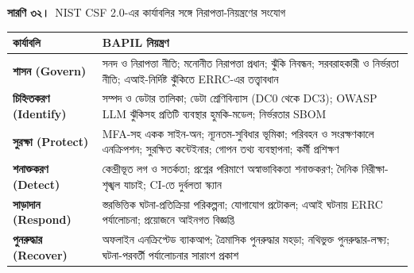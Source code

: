 \documentclass[border=10pt]{standalone}
\begin{document}
\begin{minipage}{17cm}
{\large\bfseries সারণি ৩২।}\ {\large NIST CSF 2.0-এর কার্যাবলির সঙ্গে নিরাপত্তা-নিয়ন্ত্রণের সংযোগ}\par\vspace{7pt}
\small
{}
\begin{tabularx}{\linewidth}{@{}>{\hsize=0.377\hsize\raggedright\arraybackslash}X>{\hsize=1.623\hsize\raggedright\arraybackslash}X@{}}
\arrayrulecolor{bapilrule}\toprule
\rowcolor{white}\textbf{কার্যাবলি} & \textbf{BAPIL নিয়ন্ত্রণ} \\
\midrule
\textbf{শাসন (Govern)} & সনদ ও নিরাপত্তা নীতি; মনোনীত নিরাপত্তা প্রধান; ঝুঁকি নিবন্ধন; সরবরাহকারী ও নির্ভরতা নীতি; এআই-নির্দিষ্ট ঝুঁকিতে ERRC-এর তত্ত্বাবধান \\
\textbf{চিহ্নিতকরণ (Identify)} & সম্পদ ও ডেটার তালিকা; ডেটা শ্রেণিবিন্যাস (DC0 থেকে DC3); OWASP LLM ঝুঁকিসহ প্রতিটি ব্যবস্থার হুমকি-মডেল; নির্ভরতার SBOM \\
\textbf{সুরক্ষা (Protect)} & MFA-সহ একক সাইন-অন; ন্যূনতম-সুবিধার ভূমিকা; পরিবহন ও সংরক্ষণকালে এনক্রিপশন; সুরক্ষিত কন্টেইনার; গোপন তথ্য ব্যবস্থাপনা; কর্মী প্রশিক্ষণ \\
\textbf{শনাক্তকরণ (Detect)} & কেন্দ্রীভূত লগ ও সতর্কতা; প্রশ্নের পরিমাণে অস্বাভাবিকতা শনাক্তকরণ; দৈনিক নিরীক্ষা-শৃঙ্খল যাচাই; CI-তে দুর্বলতা স্ক্যান \\
\textbf{সাড়াদান (Respond)} & স্তরভিত্তিক ঘটনা-প্রতিক্রিয়া পরিকল্পনা; যোগাযোগ প্রটোকল; এআই ঘটনায় ERRC পর্যালোচনা; প্রয়োজনে আইনগত বিজ্ঞপ্তি \\
\textbf{পুনরুদ্ধার (Recover)} & অফলাইন এনক্রিপ্টেড ব্যাকআপ; ত্রৈমাসিক পুনরুদ্ধার মহড়া; নথিভুক্ত পুনরুদ্ধার-লক্ষ্য; ঘটনা-পরবর্তী পর্যালোচনার সারাংশ প্রকাশ \\
\bottomrule
\end{tabularx}
\par{}
\end{minipage}
\end{document}
